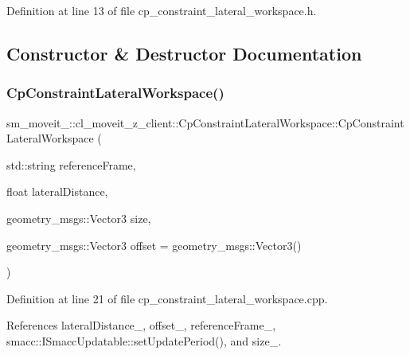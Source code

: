 Definition at line 13 of file cp\+\_\+constraint\+\_\+lateral\+\_\+workspace.\+h.



\subsection{Constructor \& Destructor Documentation}
\mbox{\label{classsm__moveit__4_1_1cl__moveit__z__client_1_1CpConstraintLateralWorkspace_a698854121e40c7c12ef8fce6f684cfea}} 
\subsubsection{\texorpdfstring{Cp\+Constraint\+Lateral\+Workspace()}{CpConstraintLateralWorkspace()}}
{\footnotesize\ttfamily sm\+\_\+moveit\+\_\+::cl\+\_\+moveit\+\_\+z\+\_\+client\+::\+Cp\+Constraint\+Lateral\+Workspace\+::\+Cp\+Constraint\+Lateral\+Workspace (\begin{DoxyParamCaption}\item[{std\+::string}]{reference\+Frame,  }\item[{float}]{lateral\+Distance,  }\item[{geometry\+\_\+msgs\+::\+Vector3}]{size,  }\item[{geometry\+\_\+msgs\+::\+Vector3}]{offset = {\ttfamily geometry\+\_\+msgs\+:\+:Vector3()} }\end{DoxyParamCaption})}



Definition at line 21 of file cp\+\_\+constraint\+\_\+lateral\+\_\+workspace.\+cpp.



References lateral\+Distance\+\_\+, offset\+\_\+, reference\+Frame\+\_\+, smacc\+::\+I\+Smacc\+Updatable\+::set\+Update\+Period(), and size\+\_\+.


